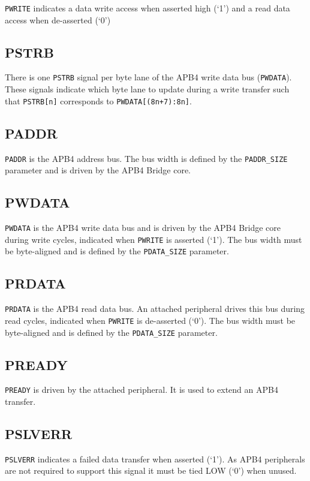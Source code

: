 \texttt{PWRITE} indicates a data write access when asserted high (`1') and a read
data access when de-asserted (`0')

\subsection{PSTRB}\label{pstrb}

There is one \texttt{PSTRB} signal per byte lane of the APB4 write data bus
(\texttt{PWDATA}). These signals indicate which byte lane to update during a
write transfer such that \texttt{PSTRB[n]} corresponds to
\texttt{PWDATA[(8n+7):8n]}.

\subsection{PADDR}\label{paddr}

\texttt{PADDR} is the APB4 address bus. The bus width is defined by the
\texttt{PADDR\_SIZE} parameter and is driven by the APB4 Bridge core.

\subsection{PWDATA}\label{pwdata}

\texttt{PWDATA} is the APB4 write data bus and is driven by the APB4 Bridge core
during write cycles, indicated when \texttt{PWRITE} is asserted (`1'). The bus
width must be byte-aligned and is defined by the \texttt{PDATA\_SIZE} parameter.

\subsection{PRDATA}\label{prdata}

\texttt{PRDATA} is the APB4 read data bus. An attached peripheral drives this bus
during read cycles, indicated when \texttt{PWRITE} is de-asserted (`0'). The bus
width must be byte-aligned and is defined by the \texttt{PDATA\_SIZE} parameter.

\subsection{PREADY}\label{pready}

\texttt{PREADY} is driven by the attached peripheral. It is used to extend an
APB4 transfer.

\subsection{PSLVERR}\label{pslverr}

\texttt{PSLVERR} indicates a failed data transfer when asserted (`1'). As APB4
peripherals are not required to support this signal it must be tied LOW
(`0') when unused.
